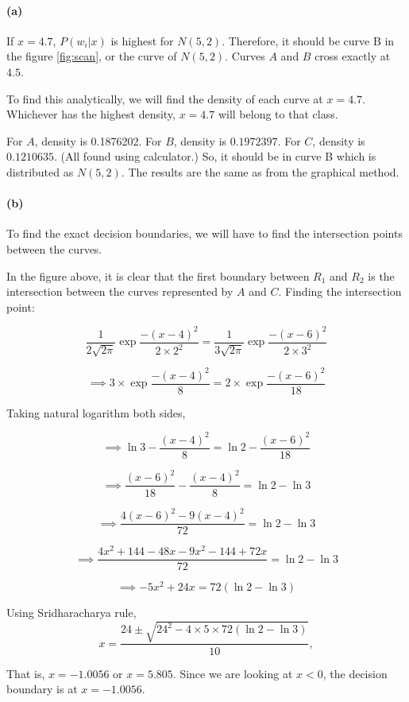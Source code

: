 \documentclass{article}
\begin{document}
\paragraph{(a)}

If $x = 4.7$, $P(w_i|x)$ is highest for $N(5,2)$. Therefore, it should be curve B in the figure \ref{fig:scan}, or the curve of $N(5,2)$. Curves $A$ and $B$ cross exactly at $4.5$.

To find this analytically, we will find the density of each curve at $x=4.7$. Whichever has the highest density, $x=4.7$ will belong to that class.

For $A$, density is 0.1876202. For $B$, density is $0.1972397$. For $C$, density is $0.1210635$. (All found using calculator.) So, it should be in curve B which is distributed as $N(5,2)$. The results are the same as from the graphical method.

\paragraph{(b)}

To find the exact decision boundaries, we will have to find the intersection points between the curves.

In the figure above, it is clear that the first boundary between $R_1$ and $R_2$ is the intersection between the curves represented by $A$ and $C$. Finding the intersection point:

$$
\frac{1}{2\sqrt{2\pi}} \exp{\frac{-(x-4)^2}{2 \times 2^2}} = 
\frac{1}{3\sqrt{2\pi}} \exp{\frac{-(x-6)^2}{2 \times 3^2}}
$$

$$
\implies
3\times \exp{\frac{-(x-4)^2}{8}} = 
2\times \exp{\frac{-(x-6)^2}{18}}
$$

Taking natural logarithm both sides,

$$
\implies
\ln{3} - \frac{(x-4)^2}{8} = 
\ln{2} - \frac{(x-6)^2}{18}
$$

$$
\implies \frac{(x-6)^2}{18} - \frac{(x-4)^2}{8}
 = \ln{2} - \ln{3}
$$


$$
\implies \frac{4(x-6)^2 - 9(x-4)^2}{72} = \ln{2} - \ln{3}
$$

$$
\implies \frac{4x^2 + 144 - 48x - 9x^2 - 144 + 72x}{72} = \ln{2} - \ln{3}
$$

$$
\implies -5x^2 + 24x = 72(\ln{2} - \ln{3})
$$

Using Sridharacharya rule,
$$
x = \frac{24 \pm \sqrt{24^2 - 4\times5\times72(\ln{2} - \ln{3})}}{10},
$$

That is, $x = -1.0056$ or $x = 5.805$. Since we are looking at $x<0$, the decision boundary is at $x = -1.0056$.
\end{document}
